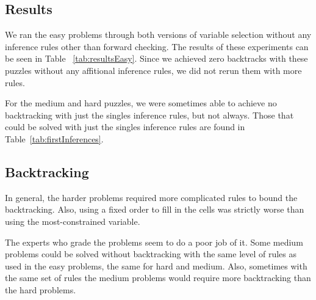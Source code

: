 \documentclass{article}
\begin{document}
\begin{algorithm}
\section{Results}
We ran the easy problems through both versions of variable selection without any inference rules other than forward checking. The results of these experiments can be seen in Table ~\ref{tab:resultsEasy}. Since we achieved zero backtracks with these puzzles without any affitional inference rules, we did not rerun them with more rules.

For the medium and hard puzzles, we were sometimes able to achieve no backtracking with just the singles inference rules, but not always. Those that could be solved with just the singles inference rules are found in Table~\ref{tab:firstInferences}.
\subsection{Backtracking}
In general, the harder problems required more complicated rules to bound the backtracking. Also, using a fixed order to fill in the cells was strictly worse than using the most-constrained variable.

The experts who grade the problems seem to do a poor job of it. Some medium problems could be solved without backtracking with the same level of rules as used in the easy problems, the same for hard and medium. Also, sometimes with the same set of rules the medium problems would require more backtracking than the hard problems.

\end{algorithm}
\end{document}
